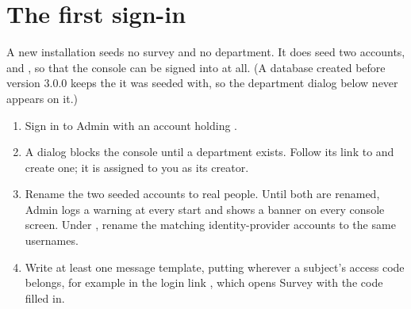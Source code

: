 \documentclass[11pt, a4paper]{article}
\begin{document}
\section{The first sign-in}
\label{sec:firstsignin}

A new installation seeds no survey and no department. It does seed two accounts, 
and , so that the console can be signed into at all. (A database created before
version 3.0.0 keeps the  it was seeded with, so the department dialog
below never appears on it.)



\begin{enumerate}
  \item Sign in to Admin with an account holding .
  \item A dialog blocks the console until a department exists. Follow its link to
         and create one; it is assigned to you as its creator.
  \item Rename the two seeded accounts to real people. Until both are renamed, Admin logs a
        warning at every start and shows a banner on every console screen. Under
        , rename the matching identity-provider
        accounts to the same usernames.
  \item Write at least one message template, putting  wherever a subject's
        access code belongs, for example in the login link
        , which opens Survey with the
        code filled in.
\end{enumerate}


\end{document}
